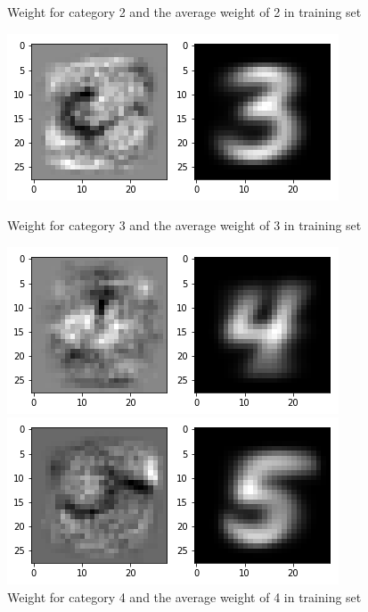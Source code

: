 \documentclass{article}
\begin{document}
\begin{figure}[thbp]
\begin{minipage}{0.48\textwidth}
		\caption{Weight for category 2 and the average weight of 2 in training set}
	\end{minipage}\hfill
	\begin {minipage}{0.48\textwidth}
	\centering
	\includegraphics[width=\textwidth]{pics/3.png}
	\caption{Weight for category 3 and the average weight of 3 in training set}
\end{minipage}
	\begin{minipage}{0.48\textwidth}
		\centering
		\includegraphics[width=\textwidth]{pics/4.png}
		\caption{Weight for category 4 and the average weight of 4 in training set}
	\end{minipage}\hfill
	\begin {minipage}{0.48\textwidth}
	\centering
	\includegraphics[width=\textwidth]{pics/5.png}

\end{minipage}
\end{figure}
\end{document}
